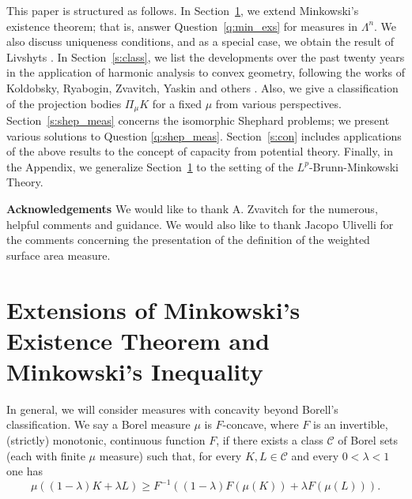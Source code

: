 \documentclass[11pt]{amsart}
\theoremstyle{definition}
\theoremstyle{remark}
\numberwithin{equation}{section}
\begin{document}
 This paper is structured as follows. In Section~\ref{s:min}, we extend Minkowski's existence theorem; that is, answer Question~\ref{q:min_exs} for measures in $\Lambda^n$. We also discuss uniqueness conditions, and as a special case, we obtain the result of Livshyts \cite{GAL19}. In Section~\ref{s:class}, we list the developments over the past twenty years in the application of harmonic analysis to convex geometry, following the works of Koldobsky, Ryabogin, Zvavitch, Yaskin and others \cite{AK05, KRZ04_1, KY08, KZ15}. Also, we give a classification of the projection bodies $\Pi_\mu K$ for a fixed $\mu$ from various perspectives. Section~\ref{s:shep_meas} concerns the isomorphic Shephard problems; we present various solutions to Question \ref{q:shep_meas}. Section~\ref{s:con} includes applications of the above results to the concept of capacity from potential theory. Finally, in the Appendix, we generalize Section~\ref{s:min} to the setting of the $L^p$-Brunn-Minkowski Theory.

\textbf{Acknowledgements} We would like to thank A. Zvavitch for the numerous, helpful comments and guidance. We would also like to thank Jacopo Ulivelli for the comments concerning the presentation of the definition of the weighted surface area measure.

\section{Extensions of Minkowski's Existence Theorem and Minkowski's Inequality}
\label{s:min}
In general, we will consider measures with concavity beyond Borell's classification. We say a Borel measure $\mu$ is $F$-concave, where $F$ is an invertible, (strictly) monotonic, continuous function $F$, if there exists a class $\mathcal{C}$ of Borel sets (each with finite $\mu$ measure) such that, for every $K,L\in\mathcal{C}$ and every $0<\lambda <1$ one has 
 \begin{equation}
	\label{eq:concave}
	\mu\left((1-\lambda)K+\lambda L\right)\geq F^{-1}\left((1-\lambda) F(\mu(K)) +\lambda F(\mu(L))\right).
	\end{equation}
\end{document}
